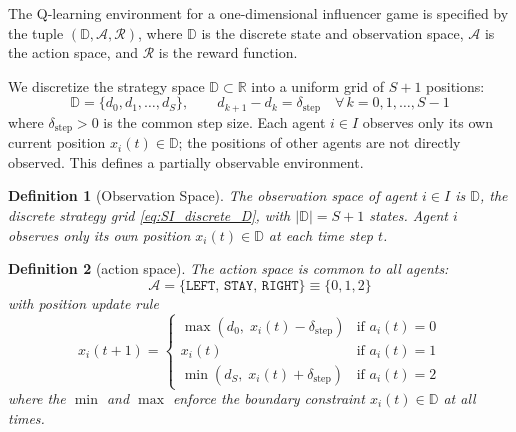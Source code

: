 \documentclass{article}
\newtheorem{definition}{Definition}
\begin{document}
            The Q-learning environment for a one-dimensional influencer game is specified by the tuple $(\mathbb{D}, \mathcal{A}, \mathcal{R})$, where $\mathbb{D}$ is the discrete state and observation space, $\mathcal{A}$ is the action space, and $\mathcal{R}$ is the reward function.

            We discretize the strategy space $\mathbb{D} \subset \mathbb{R}$ into a uniform grid of $S+1$ positions:
            \begin{equation}\label{eq:SI_discrete_D}
                \mathbb{D} = \{d_0, d_1, \ldots, d_S\}, \qquad d_{k+1} - d_k = \delta_{\mathrm{step}} \quad \forall\, k = 0, 1, \ldots, S-1
            \end{equation}
            where $\delta_{\mathrm{step}} > 0$ is the common step size. Each agent $i \in I$ observes only its own current position $x_i(t) \in \mathbb{D}$; the positions of other agents are not directly observed. This defines a partially observable environment.

            \begin{definition}[Observation Space]\label{def:SI_obs_space}
                The observation space of agent $i \in I$ is $\mathbb{D}$, the discrete strategy grid \cref{eq:SI_discrete_D}, with $|\mathbb{D}| = S+1$ states. Agent $i$ observes only its own position $x_i(t) \in \mathbb{D}$ at each time step $t$.
            \end{definition}

            \begin{definition}[action space]\label{def:SI_action_space}
                The action space is common to all agents:
                \begin{equation}
                    \mathcal{A} = \{\texttt{LEFT},\,\texttt{STAY},\,\texttt{RIGHT}\} \equiv \{0, 1, 2\}
                \end{equation}
                with position update rule
                \begin{equation}\label{eq:SI_pos_update}
                    x_i(t+1) = \begin{cases}
                        \max(d_0,\; x_i(t) - \delta_{\mathrm{step}}) & \text{if } a_i(t) = 0 \\
                        x_i(t) & \text{if } a_i(t) = 1 \\
                        \min(d_S,\; x_i(t) + \delta_{\mathrm{step}}) & \text{if } a_i(t) = 2
                    \end{cases}
                \end{equation}
                where the $\min$ and $\max$ enforce the boundary constraint $x_i(t) \in \mathbb{D}$ at all times.
            \end{definition}
\end{document}
